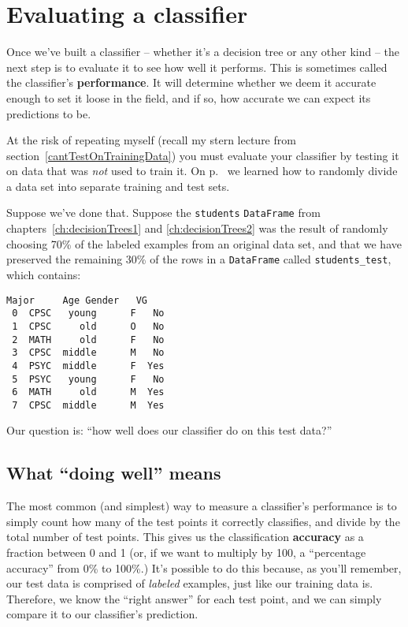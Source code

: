 
\chapter{Evaluating a classifier}


Once we've built a classifier -- whether it's a decision tree or any other kind
-- the next step is to evaluate it to see how well it performs. This is
sometimes called the classifier's \textbf{performance}. It will determine
whether we deem it accurate enough to set it loose in the field, and if so, how
accurate we can expect its predictions to be.

At the risk of repeating myself (recall my stern lecture from
section~\ref{cantTestOnTrainingData}) you must evaluate your classifier by
testing it on data that was \textit{not} used to train it. On
p.~\pageref{sampleRows} we learned how to randomly divide a data set into
separate training and test sets.

Suppose we've done that. Suppose the \texttt{students} \texttt{DataFrame} from
chapters~\ref{ch:decisionTrees1} and \ref{ch:decisionTrees2} was the result of
randomly choosing 70\% of the labeled examples from an original data set, and
that we have preserved the remaining 30\% of the rows in a \texttt{DataFrame}
called \texttt{students\_test}, which contains:

\begin{Verbatim}[fontsize=\small,samepage=true,frame=single,framesep=3mm,xleftmargin=2.4cm,xrightmargin=2.5cm]
   Major     Age Gender   VG
 0  CPSC   young      F   No
 1  CPSC     old      O   No
 2  MATH     old      F   No
 3  CPSC  middle      M   No
 4  PSYC  middle      F  Yes
 5  PSYC   young      F   No
 6  MATH     old      M  Yes
 7  CPSC  middle      M  Yes
\end{Verbatim}

Our question is: ``how well does our classifier do on this test data?''

\section{What ``doing well'' means}


The most common (and simplest) way to measure a classifier's performance is to
simply count how many of the test points it correctly classifies, and divide by
the total number of test points. This gives us the classification
\textbf{accuracy} as a fraction between 0 and 1 (or, if we want to multiply by
100, a ``percentage accuracy'' from 0\% to 100\%.) It's possible to do this
because, as you'll remember, our test data is comprised of \textit{labeled}
examples, just like our training data is. Therefore, we know the ``right
answer'' for each test point, and we can simply compare it to our classifier's
prediction.

